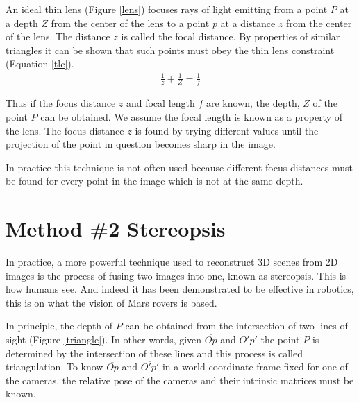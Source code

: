 \documentclass[twoside]{article}
\begin{document}
An ideal thin lens (Figure \ref{lens}) focuses rays of light emitting from a point $P$ at a depth $Z$ from the center of the lens to a point $p$ at a distance $z$ from the center of the lens. The distance $z$ is called the focal distance. By properties of similar triangles it can be shown that such points must obey the thin lens constraint (Equation \ref{tlc}).
\begin{align}
  \label{tlc}
  \frac{1}{z} + \frac{1}{Z} = \frac{1}{f}
\end{align}

Thus if the focus distance $z$ and focal length $f$ are known, the depth, $Z$ of the point $P$ can be obtained. We assume the focal length is known as a property of the lens. The focus distance $z$ is found by trying different values until the projection of the point in question becomes sharp in the image. 

In practice this technique is not often used because different focus distances must be found for every point in the image which is not at the same depth. 

\section{Method \#2 Stereopsis}

In practice, a more powerful technique used to reconstruct 3D scenes from 2D images is the process of fusing two images into one, known as stereopsis. This is how humans see. And indeed it has been demonstrated to be effective in robotics, this is on what the vision of Mars rovers is based.

In principle, the depth of $P$ can be obtained from the intersection of two lines of sight (Figure \ref{triangle}). In other words, given $\overline{Op}$ and $\overline{O'p'}$ the point $P$ is determined by the intersection of these lines and this process is called triangulation. To know $\overline{Op}$ and $\overline{O'p'}$ in a  world coordinate frame fixed for one of the cameras, the relative pose of the cameras and their intrinsic matrices must be known.
\end{document}

